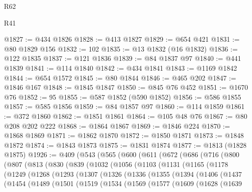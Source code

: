 \begin{lexlean}{R62}
\begin{lexlean}{R41}
\begin{coremodule}
{{{{{{{{{{{{{{{{{{{{{{{{{{{{{{{{{{{{{{{{{{{{{{{{{{{{{{{{{{{{{{{{{{{{{{{{{{{{{{{{{{{{{{{@1827 := @434 @1826
@1828 := @413 @1827
@1829 := @654 @421
@1831 := @80 @1829 @156
@1832 := 102
@1835 := @13 @1832 (@16 @1832)
@1836 := @122 @1835
@1837 := @121 @1836
@1839 := @84 @1837 @97
@1840 := @441 @1839
@1841 := @114 @1840
@1842 := @434 @1841
@1843 := @1169 @1842
@1844 := @654 @1572
@1845 := @80 @1844
@1846 := @465 @202
@1847 := @1846 @167
@1848 := @1845 @1847
@1850 := @845 @76 @452
@1851 := @1670 @76
@1852 := 95
@1855 := @587 @1852 (@590 @1852)
@1856 := @586 @1855
@1857 := @585 @1856
@1859 := @84 @1857 @97
@1860 := @114 @1859
@1861 := @372 @1860
@1862 := @1851 @1861
@1864 := @105 @48 @76
@1867 := @80 @208 @202 @222
@1868 := @1864 @1867
@1869 := @1846 @224
@1870 := @1868 @1869
@1871 := @1862 @1870
@1872 := @1850 @1871
@1873 := @1848 @1872
@1874 := @1843 @1873
@1875 := @1831 @1874
@1877 := @1813 (@1828 @1875)
@1926 := @409
    (@543
      (@565
        (@600
          (@611
            (@672
              (@686
                (@716
                  (@800
                    (@807
                      (@813
                        (@830
                          (@839
                            (@1032
                              (@1056
                                (@1103
                                  (@1131
                                    (@1165
                                      (@1178
                                        (@1249
                                          (@1268
                                            (@1293
                                              (@1307
                                                (@1326
                                                  (@1336
                                                    (@1355
                                                      (@1394
                                                        (@1406
                                                          (@1437
                                                            (@1454
                                                              (@1489
                                                                (@1501
                                                                  (@1519
                                                                    (@1534
                                                                      (@1569
                                                                        (@1577
                                                                          (@1609
                                                                            (@1628
                                                                              (@1639
}}}}}}}}}}}}}}}}}}}}}}}}}}}}}}}}}}}}}}}}}}}}}}}}}}}}}}}}}}}}}}}}}}}}}}}}}}}}}}}}}}}}}}}
\end{coremodule}
\end{lexlean}
\end{lexlean}
